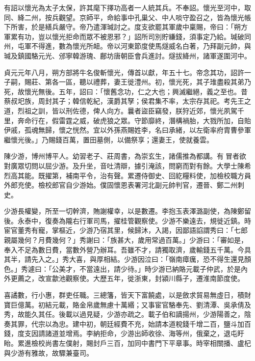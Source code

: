 \begin{pinyinscope}
 有詔以懷光為太子太保，許其麾下擇功高者一人統其兵。不奉詔。懷光至河中，取同、絳二州，按兵觀望。京師平，命給事中孔巢父、中人啖守盈召之，皆為懷光帳下所害，於是繕兵嚴守。帝乃遣渾瑊討之。度支欲罷其軍歲中稟賜，帝曰：「朔方軍累有功，豈以懷光拒命而眾不被恩邪？」詔所司別貯縑錢，須事定乃給。瑊破同州，屯軍不得進，數為懷光所衄。帝以河東節度使馬燧威名白著，乃拜副元帥，與瑊及鎮國駱元光、邠寧韓游瑰、鄜坊唐朝臣會兵進討。燧拔絳州，諸軍遂圍河中。



 貞元元年八月，朔方部將牛名俊斬懷光，傳首以獻，年五十七。帝念其功，詔許一子嗣，賜莊、第各一區，聽以禮葬，妻王徙澧州。初，懷光死，其子琟盡殺其弟乃死，故懷光無後。五年，詔曰：「懷舊念功，仁之大也；興滅繼絕，義之至也。昔蔡叔圯族，周封其子；韓信乾紀，漢爵其孥；侯君集不率，太宗存其祀。考先王之道，烈祖之訓，皆以刑佐德，俾人向方。曩者盜臣竊發，朕狩近郊，懷光夙駕千里，奔命行在，假雷霆之威，破虎狼之眾。守節靡終，潛構禍胎，大戮所加，自貽伊戚，孤魂無歸，懷之恍然。宜以外孫燕賜姓李，名曰承緒，以左衛率府胄曹參軍繼懷光後。」乃賜錢百萬，置田墓側，以備祭享；還妻王，使就養雲。



 陳少游，博州博平人。幼習老子、莊周書，為崇玄生，諸儒推為都講。有冒者欲對廣眾切問以屈少游。及升坐，音吐清辯，據引淹該，問窮而對有餘。大學士陳希烈高其能。既擢第，補南平令，治有聲。累遷侍御史、回紇糧料使，加檢校職方員外郎充使。檢校郎官自少游始。僕固懷恩表署河北副元帥判官，遷晉、鄭二州刺史。



 少游長權變，所至一切幹濟，賄謝權幸，以是數遷。李抱玉表澤潞副使，為陳鄭留後。永泰中，復奏為隴右行軍司馬，擢桂管觀察使。少游不樂遠去，規徙近鎮。時宦官董秀有寵，掌樞近，少游乃宿其里，候歸沐，入謁，因鄙語諂謂秀曰：「七郎親屬幾何？月費幾何？」秀謝曰：「族甚大，歲用常過百萬。」少游曰：「審如是，奉入不足為數日費，當數外營乃辦耳。吾雖不才，請獨取濟，歲輸錢五千萬。今具其半，請先入之。」秀大喜，與厚相結。少游因泣曰：「嶺南瘴癘，恐不得生還見顏色。」秀遽曰：「公美才，不當遠出，請少待。」時少游已納賂元載子仲武，於是內外更薦之，改宣歙池觀察使。大歷五年，徙浙東，封潁川縣子，遷淮南節度使。



 喜譎數，行小惠，群吏任職。三總籓，皆天下富饒處，以是斂求貿易無虛日，積財寶巨億萬。初結元載，賂金帛歲無慮十萬緡；又事宦官駱奉先、劉清潭、吳承倩及秀，故能久其任。後載以過見疑，少游亦疏之。載子伯和謫揚州，少游陽善之，陰奏其罪，代宗以為忠。建中初，朝廷經費不充，始請本道稅錢千增二百，鹽斗加百錢，度支因請諸道並增焉。李納拒命，少游出師收徐、海等州，俄棄之，退屯盱眙。累進檢校尚書左僕射，賜封戶三百，加同中書門下平章事。時宰相關播、盧杞與少游有雅故，故驟兼臺司。




\end{pinyinscope}
